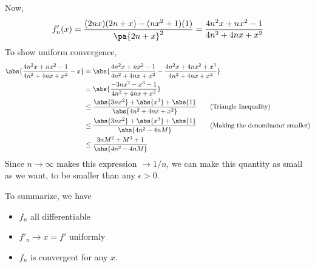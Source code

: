 {{Now, 
\begin{equation*}
  f'_n(x) = \frac{
    (2nx)(2n+x) - (nx^2+1)(1)
  }{
    \pa{2n+x}^2
  } = \frac{
    4n^2x + nx^2 - 1
  }{
    4n^2 + 4nx + x^2
  }
\end{equation*}
To show uniform convergence,
\begin{align*}
  \abs{
    \frac{
      4n^2x + nx^2 - 1
    }{
      4n^2 + 4nx + x^2
    } - x
  } 
  &= \abs{
    \frac{
      4n^2x + nx^2 - 1
    }{
      4n^2 + 4nx + x^2
    } -
    \frac{
      4n^2x + 4nx^2 + x^3
    }{
      4n^2 + 4nx + x^2
    }
  }\\
  &= \abs{
    \frac{
      -3nx^2 - x^3 - 1
    }{
      4n^2 + 4nx + x^2
    }
  }\\
  &\leq \frac{
    \abs{3nx^2} + \abs{x^3} + \abs{1}
  }{
    \abs{
      4n^2 + 4nx + x^2
    }
  }\tag{Triangle Inequality}\\
  &\leq \frac{
    \abs{3nx^2} + \abs{x^3} + \abs{1}
  }{
    \abs{
      4n^2 - 4nM
    }
  }\tag{Making the denominator smaller}\\
  &\leq \frac{
    3nM^2 + M^3 + 1
  }{
    \abs{
      4n^2 - 4nM
    }
  }
\end{align*}
Since $n \to \infty$ makes this expression $\to 1/n$, 
we can make this quantity as small as we want, to be 
smaller than any $\epsilon > 0$.

To summarize, we have 
\begin{itemize}
  \item $f_n$ all differentiable
  \item $f'_n \to x = f'$ uniformly
  \item $f_n$ is convergent for any $x$.
\end{itemize}
}
}

